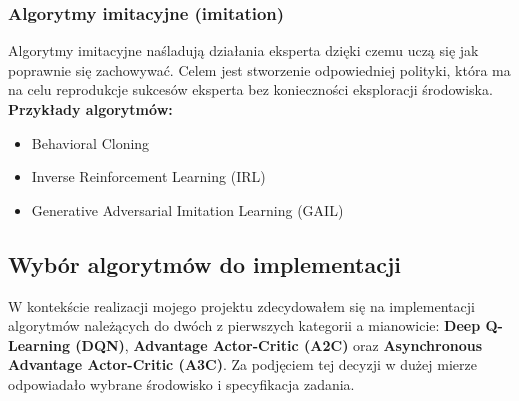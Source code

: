 \documentclass[a4paper, 12pt]{article}
\begin{document}
    \subsubsection{Algorytmy imitacyjne (imitation)}
    Algorytmy imitacyjne naśladują działania eksperta dzięki czemu uczą się jak poprawnie się zachowywać. Celem jest
    stworzenie odpowiedniej polityki, która ma na celu reprodukcje sukcesów eksperta bez konieczności eksploracji środowiska.
    \\ \textbf{Przykłady algorytmów:}
    \begin{itemize}
        \item Behavioral Cloning
        \item Inverse Reinforcement Learning (IRL)
        \item Generative Adversarial Imitation Learning (GAIL)
    \end{itemize}
    \subsection{Wybór algorytmów do implementacji}
    W kontekście realizacji mojego projektu zdecydowałem się na implementacji algorytmów należących do dwóch z pierwszych kategorii a mianowicie:
    \textbf{Deep Q-Learning (DQN)}, \textbf{Advantage Actor-Critic (A2C)} oraz \textbf{Asynchronous Advantage Actor-Critic (A3C)}.
    Za podjęciem tej decyzji w dużej mierze odpowiadało wybrane środowisko i specyfikacja zadania.
\end{document}
